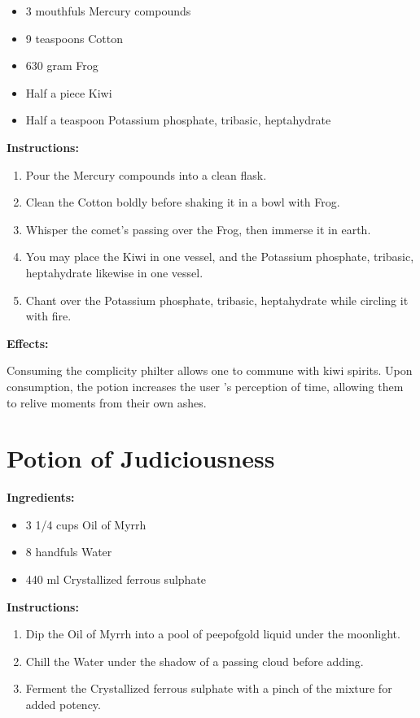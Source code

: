 \documentclass{article}
\begin{document}
\begin{itemize}
  \item 3 mouthfuls Mercury compounds
  \item 9 teaspoons Cotton
  \item 630 gram Frog
  \item Half a piece Kiwi
  \item Half a teaspoon Potassium phosphate, tribasic, heptahydrate
\end{itemize}

\textbf{Instructions:}

\begin{enumerate}
  \item Pour the Mercury compounds into a clean flask.
  \item Clean the Cotton boldly before shaking it in a bowl with Frog.
  \item Whisper the comet’s passing over the Frog, then immerse it in earth.
  \item You may place the Kiwi in one vessel, and the Potassium phosphate, tribasic, heptahydrate likewise in one vessel.
  \item Chant over the Potassium phosphate, tribasic, heptahydrate while circling it with fire.
\end{enumerate}

\textbf{Effects:}

Consuming the complicity philter allows one to commune with kiwi spirits. Upon consumption, the potion increases the user 's perception of time, allowing them to relive moments from their own ashes.

\newpage
\section*{Potion of Judiciousness}

\textbf{Ingredients:}

\begin{itemize}
  \item 3 1/4 cups Oil of Myrrh
  \item 8 handfuls Water
  \item 440 ml Crystallized ferrous sulphate
\end{itemize}

\textbf{Instructions:}

\begin{enumerate}
  \item Dip the Oil of Myrrh into a pool of peepofgold liquid under the moonlight.
  \item Chill the Water under the shadow of a passing cloud before adding.
  \item Ferment the Crystallized ferrous sulphate with a pinch of the mixture for added potency.
\end{enumerate}
\end{document}
